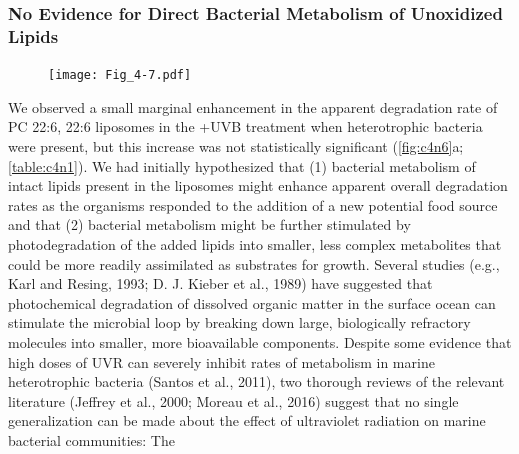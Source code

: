 \subsubsection{No Evidence for Direct Bacterial Metabolism of Unoxidized Lipids}
\begin{figure}[!p]
\centering
\texttt{[image: Fig\_4-7.pdf]}
\end{figure}

We observed a small marginal enhancement in the apparent degradation rate of PC 22:6, 22:6 liposomes in the +UVB treatment when heterotrophic bacteria were present, but this increase was not statistically significant (\autoref{fig:c4n6}a; \autoref{table:c4n1}). We had initially hypothesized that (1) bacterial metabolism of intact lipids present in the liposomes might enhance apparent overall degradation rates as the organisms responded to the addition of a new potential food source and that (2) bacterial metabolism might be further stimulated by photodegradation of the added lipids into smaller, less complex metabolites that could be more readily assimilated as substrates for growth. Several studies (e.g., Karl and Resing, 1993; D. J. Kieber et al., 1989) have suggested that photochemical degradation of dissolved organic matter in the surface ocean can stimulate the microbial loop by breaking down large, biologically refractory molecules into smaller, more bioavailable components. Despite some evidence that high doses of UVR can severely inhibit rates of metabolism in marine heterotrophic bacteria (Santos et al., 2011), two thorough reviews of the relevant literature (Jeffrey et al., 2000; Moreau et al., 2016) suggest that no single generalization can be made about the effect of ultraviolet radiation on marine bacterial communities: The \begin{figure} [!t]

\end{figure}
